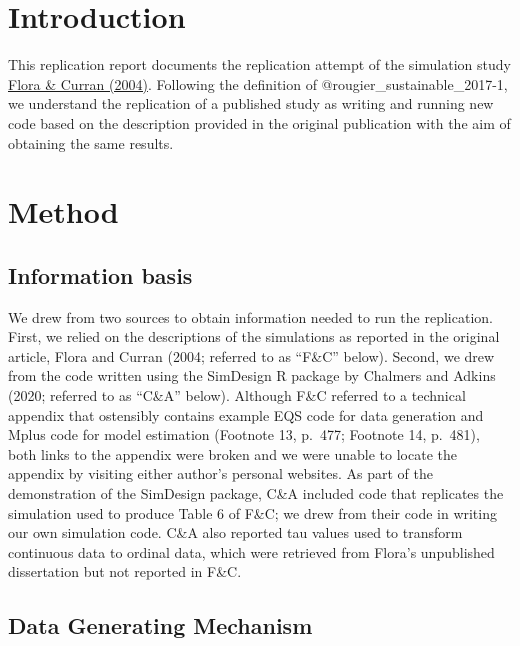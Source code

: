 \documentclass[10,a4paperpaper,]{article}
\begin{document}
\par

\newpage

\section{Introduction}

This replication report documents the replication attempt of the
simulation study
\href{https://www.semanticscholar.org/paper/An-empirical-evaluation-of-alternative-methods-of-Flora-Curran/14e0a32ce0d079e45a54b78c5bc30735750c955f}{Flora
\& Curran (2004)}. Following the definition of
@rougier\_sustainable\_2017-1, we understand the replication of a
published study as writing and running new code based on the description
provided in the original publication with the aim of obtaining the same
results.

\section{Method}

\subsection{Information basis}

We drew from two sources to obtain information needed to run the
replication. First, we relied on the descriptions of the simulations as
reported in the original article, Flora and Curran (2004; referred to as
``F\&C'' below). Second, we drew from the code written using the
SimDesign R package by Chalmers and Adkins (2020; referred to as
``C\&A'' below). Although F\&C referred to a technical appendix that
ostensibly contains example EQS code for data generation and Mplus code
for model estimation (Footnote 13, p.~477; Footnote 14, p.~481), both
links to the appendix were broken and we were unable to locate the
appendix by visiting either author's personal websites. As part of the
demonstration of the SimDesign package, C\&A included code that
replicates the simulation used to produce Table 6 of F\&C; we drew from
their code in writing our own simulation code. C\&A also reported tau
values used to transform continuous data to ordinal data, which were
retrieved from Flora's unpublished dissertation but not reported in
F\&C.

\subsection{Data Generating Mechanism}
\end{document}
